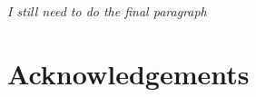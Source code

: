 \documentclass[12pt,a4paper]{article}
\begin{document}
\textit{I still need to do the final paragraph}





\section*{Acknowledgements}





\end{document}
